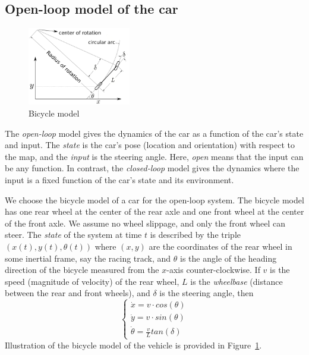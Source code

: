 \subsection{Open-loop model of the car}

\begin{figure}
\centering
\includegraphics[width=45mm]{Figures/BicycleModel-coords.pdf}%
\caption{Bicycle model \cite{Snider.2009}}
\label{fig:bicycle}%
\end{figure}

The \emph{open-loop} model gives the dynamics of the car as a function of the car's state and input.
%
The \emph{state} is the car's pose (location and orientation) with respect to the map, and the \emph{input} is the steering angle.
%
Here, \emph{open} means that the input can be any function.
%
In contrast, the \emph{closed-loop} model gives the dynamics where the input is a fixed function of the car's state and its environment.


We choose the bicycle model of a car for the open-loop system.
%
The bicycle model has one rear wheel at the center of the rear axle and one front wheel at the center of the front axle.
%
We assume no wheel slippage, and only the front wheel can steer.
%
The \emph{state} of the system at time $t$
is described by the triple $(x(t), y(t), \theta(t))$
where $(x, y)$ are the coordinates of the rear wheel
in some inertial frame, say the racing track, and
$\theta$ is the angle of the heading direction of the bicycle measured from the $x$-axis counter-clockwise.
%
If $v$ is the speed (magnitude of velocity) of the rear wheel,
$L$ is the \emph{wheelbase} (distance between the rear and front wheels),
and $\delta$ is the steering angle,
then
\[
\left\{
\begin{array}{l}
     \dot{x} = v \cdot cos(\theta) \\
     \dot{y} = v \cdot sin(\theta) \\
     \dot{\theta} = \frac{\displaystyle v}{L} tan(\delta)
\end{array}
\right.
\]
%
Illustration of the bicycle model of the vehicle is provided in Figure~\ref{fig:bicycle}.
